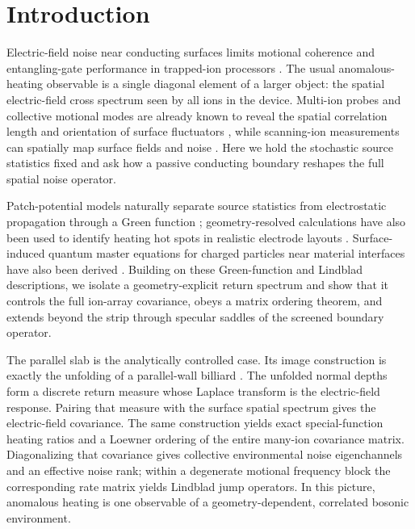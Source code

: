 \documentclass[aps,pra,twocolumn,superscriptaddress,longbibliography,nofootinbib,floatfix]{revtex4-2}
\theoremstyle{remark}
\begin{document}
\maketitle

\section{Introduction}

Electric-field noise near conducting surfaces limits motional coherence and entangling-gate performance in trapped-ion processors \cite{Turchette2000,Deslauriers2006,Brownnutt2015,Sedlacek2018,Webb2018,Sutherland2022}.  The usual anomalous-heating observable is a single diagonal element of a larger object: the spatial electric-field cross spectrum seen by all ions in the device.  Multi-ion probes and collective motional modes are already known to reveal the spatial correlation length and orientation of surface fluctuators \cite{Brownnutt2015,Galve2017}, while scanning-ion measurements can spatially map surface fields and noise \cite{Sagesser2024}.  Here we hold the stochastic source statistics fixed and ask how a passive conducting boundary reshapes the full spatial noise operator.

Patch-potential models naturally separate source statistics from electrostatic propagation through a Green function \cite{Dubessy2009,Low2011,Lin2016}; geometry-resolved calculations have also been used to identify heating hot spots in realistic electrode layouts \cite{Chu2025}.  Surface-induced quantum master equations for charged particles near material interfaces have also been derived \cite{Martinetz2022}.  Building on these Green-function and Lindblad descriptions, we isolate a geometry-explicit return spectrum and show that it controls the full ion-array covariance, obeys a matrix ordering theorem, and extends beyond the strip through specular saddles of the screened boundary operator.

The parallel slab is the analytically controlled case.  Its image construction is exactly the unfolding of a parallel-wall billiard \cite{Tabachnikov2005}.  The unfolded normal depths form a discrete return measure whose Laplace transform is the electric-field response.  Pairing that measure with the surface spatial spectrum gives the electric-field covariance.  The same construction yields exact special-function heating ratios and a Loewner ordering of the entire many-ion covariance matrix.  Diagonalizing that covariance gives collective environmental noise eigenchannels and an effective noise rank; within a degenerate motional frequency block the corresponding rate matrix yields Lindblad jump operators.  In this picture, anomalous heating is one observable of a geometry-dependent, correlated bosonic environment.
\end{document}
